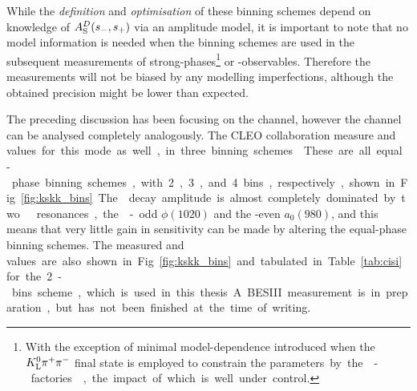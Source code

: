 

While the \emph{definition} and \emph{optimisation} of these binning schemes depend on knowledge of $A_{\rm S}^{D}(s_-, s_+)$ via an amplitude model, it is important to note that no model information is needed when the binning schemes are used in the subsequent measurements of strong-phases\footnote{With the exception of minimal model-dependence introduced when the ${{K}^0_{\mathrm{L}}}{{\pi}^+}{{\pi}^-}$ final state is employed to constrain the \si parameters by the \D-factories~\cite{CLEOCISI,BESCISI}, the impact of which is well under control.} or \CP-observables. Therefore the measurements will not be biased by any modelling imperfections, although the obtained precision might be lower than expected. 





The preceding discussion has been focusing on the \DtoKspipi channel, however the \DtoKsKK channel can be analysed completely analogously. The CLEO collaboration measure \ci and \si values for this mode as well, in three binning schemes~\cite{CLEOCISI}. These are all equal-phase binning schemes, with 2, 3, and 4 bins, respectively, shown in Fig.~\ref{fig:kskk_bins}. The \DtoKsKK decay amplitude is almost completely dominated by two \Kp\Km resonances, the \CP-odd $\phi(1020)$ and the \CP-even  $a_0(980)$, and this means that very little gain in sensitivity can be made by altering the equal-phase binning schemes. The measured \ci and \si values are also shown in Fig.~\ref{fig:kskk_bins} and tabulated in Table~\ref{tab:cisi} for the 2-bins scheme, which is used in this thesis. A BESIII measurement is in preparation, but has not been finished at the time of writing.

